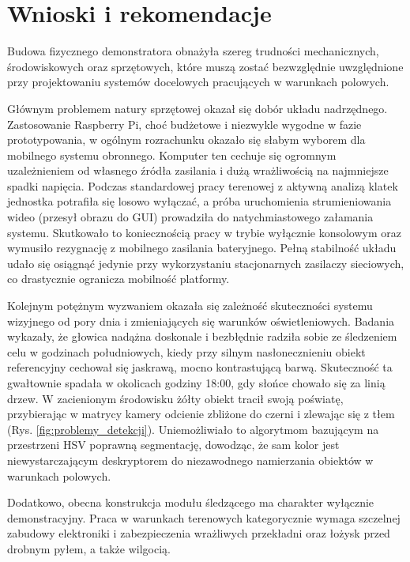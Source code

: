 \documentclass[a4paper,twoside,12pt]{book}
\begin{document}
\section{Wnioski i rekomendacje}
Budowa fizycznego demonstratora obnażyła szereg trudności mechanicznych, środowiskowych oraz sprzętowych, które muszą zostać bezwzględnie uwzględnione przy projektowaniu systemów docelowych pracujących w warunkach polowych.

Głównym problemem natury sprzętowej okazał się dobór układu nadrzędnego. Zastosowanie Raspberry Pi, choć budżetowe i niezwykle wygodne w fazie prototypowania, w ogólnym rozrachunku okazało się słabym wyborem dla mobilnego systemu obronnego. Komputer ten cechuje się ogromnym uzależnieniem od własnego źródła zasilania i dużą wrażliwością na najmniejsze spadki napięcia. Podczas standardowej pracy terenowej z aktywną analizą klatek jednostka potrafiła się losowo wyłączać, a próba uruchomienia strumieniowania wideo (przesył obrazu do GUI) prowadziła do natychmiastowego załamania systemu. Skutkowało to koniecznością pracy w trybie wyłącznie konsolowym oraz wymusiło rezygnację z mobilnego zasilania bateryjnego. Pełną stabilność układu udało się osiągnąć jedynie przy wykorzystaniu stacjonarnych zasilaczy sieciowych, co drastycznie ogranicza mobilność platformy.

Kolejnym potężnym wyzwaniem okazała się zależność skuteczności systemu wizyjnego od pory dnia i zmieniających się warunków oświetleniowych. Badania wykazały, że głowica nadążna doskonale i bezbłędnie radziła sobie ze śledzeniem celu w godzinach południowych, kiedy przy silnym nasłonecznieniu obiekt referencyjny cechował się jaskrawą, mocno kontrastującą barwą. Skuteczność ta gwałtownie spadała w okolicach godziny 18:00, gdy słońce chowało się za linią drzew. W zacienionym środowisku żółty obiekt tracił swoją poświatę, przybierając w matrycy kamery odcienie zbliżone do czerni i zlewając się z tłem (Rys. \ref{fig:problemy_detekcji}). Uniemożliwiało to algorytmom bazującym na przestrzeni HSV poprawną segmentację, dowodząc, że sam kolor jest niewystarczającym deskryptorem do niezawodnego namierzania obiektów w warunkach polowych.

Dodatkowo, obecna konstrukcja modułu śledzącego ma charakter wyłącznie demonstracyjny. Praca w warunkach terenowych kategorycznie wymaga szczelnej zabudowy elektroniki i zabezpieczenia wrażliwych przekładni oraz łożysk przed drobnym pyłem, a także wilgocią.
\end{document}
